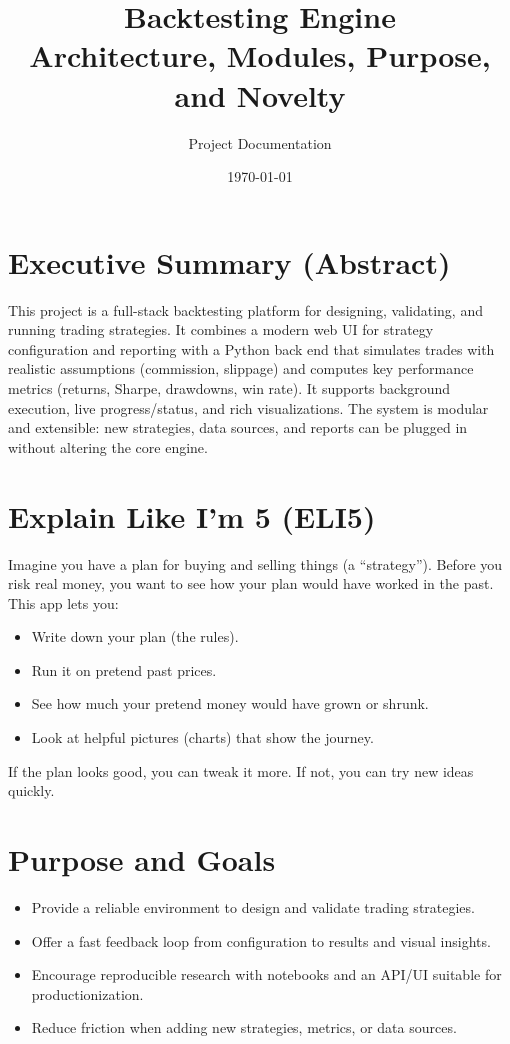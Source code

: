 \documentclass[11pt,a4paper]{article}
\title{Backtesting Engine\\Architecture, Modules, Purpose, and Novelty}
\author{Project Documentation}
\date{\today}
\begin{document}
\maketitle
\tableofcontents
\bigskip

\section*{Executive Summary (Abstract)}
This project is a full-stack backtesting platform for designing, validating, and running trading strategies. It combines a modern web UI for strategy configuration and reporting with a Python back end that simulates trades with realistic assumptions (commission, slippage) and computes key performance metrics (returns, Sharpe, drawdowns, win rate). It supports background execution, live progress/status, and rich visualizations. The system is modular and extensible: new strategies, data sources, and reports can be plugged in without altering the core engine.

\section{Explain Like I'm 5 (ELI5)}
Imagine you have a plan for buying and selling things (a ``strategy''). Before you risk real money, you want to see how your plan would have worked in the past. This app lets you:
\begin{itemize}[leftmargin=*]
  \item Write down your plan (the rules).
  \item Run it on pretend past prices.
  \item See how much your pretend money would have grown or shrunk.
  \item Look at helpful pictures (charts) that show the journey.
\end{itemize}
If the plan looks good, you can tweak it more. If not, you can try new ideas quickly.

\section{Purpose and Goals}
\begin{itemize}[leftmargin=*]
  \item Provide a reliable environment to design and validate trading strategies.
  \item Offer a fast feedback loop from configuration to results and visual insights.
  \item Encourage reproducible research with notebooks and an API/UI suitable for productionization.
  \item Reduce friction when adding new strategies, metrics, or data sources.
\end{itemize}
\end{document}
